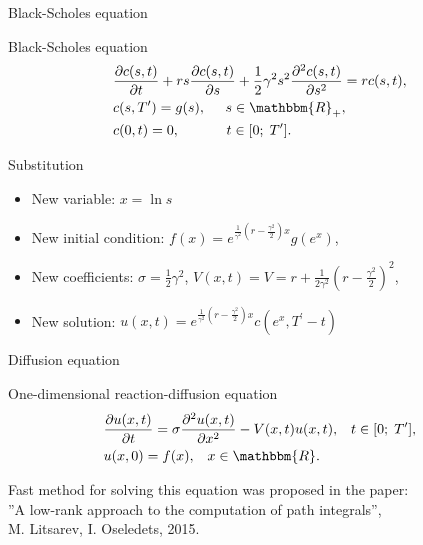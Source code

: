 \documentclass{beamer}
\theoremstyle{definition}
\theoremstyle{plain}
\theoremstyle{remark}
\begin{document}
		\begin{frame}{Black-Scholes equation}
			\vspace{-5pt}
			\begin{block}{Black-Scholes equation}
				\begin{equation}
					\begin{aligned}
						&\frac{\partial c(s,t)}{\partial t} + 
						rs \frac{\partial c(s,t)}{\partial s} + 
						\frac12 \gamma^2 s^2 \frac{\partial^2 c(s,t)}{\partial s^2} = 
						rc(s,t),\\
						&c(s,T^{\prime}) = g(s), \;\;\;\;\; s \in \mathbbm{R}_{+},\\
						&c(0,t) = 0, \;\;\;\;\;\;\;\;\;\;\;\; t \in [0;\;T^{\prime}].
						\nonumber
					\end{aligned}
				\end{equation}
			\end{block}

			\vspace{-5pt}
			\begin{block}{Substitution}
						\begin{itemize}
							\item New variable: $x=\ln s$
							\item New initial condition: $f(x) = e^{\frac{1}{\gamma^2} (r-\frac{\gamma^2}{2})x} g(e^x)$, 
							\item New coefficients: $\sigma = \frac12 \gamma^2$,
						 			$V(x,t) = V = r +  \frac{1}{2\gamma^2} \left( r-\frac{\gamma^2}{2}\right)^2$,
						 	\item New solution: $u(x,t) =  e^{\frac{1}{\gamma^2} (r-\frac{\gamma^2}{2})x} c(e^x, T^{\prime} - t)$
						\end{itemize}
			\end{block}
							
		\end{frame}

		\begin{frame}{Diffusion equation}

			\begin{block}{One-dimensional reaction-diffusion equation}
				\begin{equation}
					\begin{aligned}
						&\frac{\partial u(x,t)}{\partial t} = \sigma \frac{\partial^2 u(x,t)}{\partial x^2} - V(x,t) u(x,t),
						\;\;\; t \in [0;\;T^{\prime}],\\
						&u(x,0) = f(x), \;\;\; x \in \mathbbm{R}.
					\nonumber
					\end{aligned}
				\end{equation}
			\end{block}

			\begin{center}
				Fast method for solving this equation was proposed in the paper:\\
				''A low-rank approach to the computation of path integrals'',\\ M. Litsarev, I. Oseledets, 2015.
			\end{center}
		\end{frame}
\end{document}
